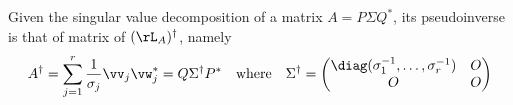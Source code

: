 \pagebreak
Given the singular value decomposition of a matrix $A=P\Sigma Q^*$, its pseudoinverse is that of matrix of $(\rL_A)^\dag$, namely%
\[A^\dag=\sum_{j=1}^r\frac 1{\sigma_j}\vv_j\vw_j^*=Q\Sigma^\dag P^* \quad\text{where}\quad\Sigma^\dag=\begin{pmatrix}
	\diag(\sigma_1^{-1},\ldots,\sigma_r^{-1})&O\\
	O&O
	\end{pmatrix}\]
	

